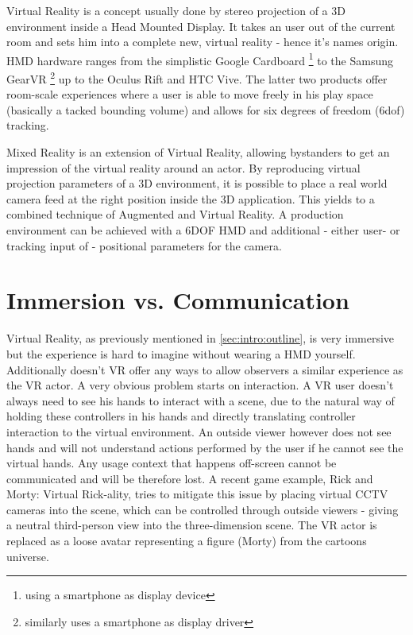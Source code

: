 Virtual Reality is a concept usually done by stereo projection of a 3D 
environment inside a Head Mounted Display. It takes an user out of the current 
room and sets him into a complete new, virtual reality - hence it's names 
origin. HMD hardware ranges from the simplistic Google Cardboard 
\footnote{using a smartphone as display device} to the Samsung GearVR 
\footnote{similarly uses a smartphone as display driver} up to the Oculus Rift 
and HTC Vive. The latter two products offer room-scale experiences where a user 
is able to move freely in his play space (basically a tacked bounding volume) 
and allows for six degrees of freedom (\gls{6dof}) tracking.

Mixed Reality is an extension of Virtual Reality, allowing bystanders to get an 
impression of the virtual reality around an actor. By reproducing virtual 
projection parameters of a 3D environment, it is possible to place a real world 
camera feed at the right position inside the 3D application. This yields to a 
combined technique of Augmented and Virtual Reality. A production environment 
can be achieved with a \gls{6DOF} HMD and additional - either user- or tracking 
input of - positional parameters for the camera. 

\section{Immersion vs. Communication}


Virtual Reality, as previously mentioned in \ref{sec:intro:outline}, is very 
immersive but the experience is hard to imagine without wearing a HMD yourself. 
Additionally doesn't VR offer any ways to allow observers a similar experience 
as the VR actor.
\newline
A very obvious problem starts on interaction. A VR user doesn't always need to 
see his hands to interact with a scene, due to the natural way of holding these 
controllers in his hands and directly translating controller interaction to the
virtual environment. An outside viewer however does not see hands and will 
not understand actions performed by the user if he cannot see the virtual 
hands. Any usage context that happens off-screen cannot be communicated and 
will be therefore lost.
\newline
A recent game example, Rick and Morty: Virtual Rick-ality, tries to mitigate 
this issue by placing virtual CCTV cameras into the scene, which can be 
controlled through outside viewers - giving a neutral third-person view into 
the three-dimension scene. The VR actor is replaced as a loose avatar 
representing a figure (Morty) from the cartoons universe.

